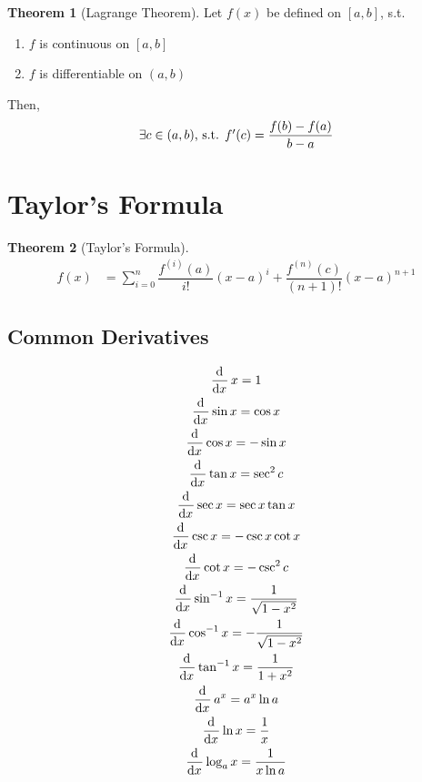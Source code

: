 \documentclass[fleqn, a4paper, 10pt]{article}
\theoremstyle{definition}
\theoremstyle{theorem}
\newtheorem{theorem}{Theorem}
\theoremstyle{remark}
\begin{document}
\begin{multicols}{2}
\begin{theorem}[Lagrange Theorem]
	Let $f(x)$ be defined on $[a, b]$, s.t. 
	\begin{enumerate}
		\item $f$ is continuous on $[a, b]$
		\item $f$ is differentiable on $(a, b)$
	\end{enumerate}
	Then, 
	\begin{equation*}
		\exists c \in (a, b)$, s.t. $f'(c) = \dfrac{f(b) - f(a)}{b - a}
	\end{equation*}
\end{theorem}

\section{Taylor's Formula}

\begin{theorem}[Taylor's Formula]
	\begin{align*}
		f(x) &= \sum_{i = 0}^{n} \dfrac{f^{(i)}(a)}{i!} (x - a)^i + \dfrac{f^{(n)}(c)}{(n+1)!} (x-a)^{n+1}
	\end{align*}
\end{theorem}

\subsection{Common Derivatives}

\begin{gather*}
\dod{}{x} x = 1\\
\dod{}{x} \sin x = \cos x\\
\dod{}{x} \cos x = - \sin x\\
\dod{}{x} \tan x = \sec^2 c\\
\dod{}{x} \sec x = \sec x \tan x\\
\dod{}{x} \csc x = - \csc x \cot x\\
\dod{}{x} \cot x = - \csc^2 c\\
\dod{}{x} \sin^{-1} x = \dfrac{1}{\sqrt{1 - x^2}}\\
\dod{}{x} \cos^{-1} x = -\dfrac{1}{\sqrt{1 - x^2}}\\
\dod{}{x} \tan^{-1} x = \dfrac{1}{1 + x^2}\\
\dod{}{x} a^x = a^x \ln a\\
\dod{}{x} \ln x = \dfrac{1}{x}\\
\dod{}{x} \log_{a} x = \dfrac{1}{x \ln a}
\end{gather*}


\end{multicols}
\end{document}
